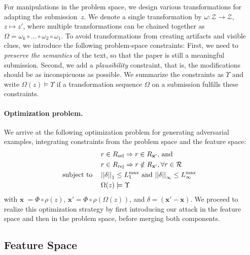\documentclass[letterpaper,twocolumn,10pt]{article}
\newcommand{\bow}{\textbf{x}}
\newcommand{\submission}{\bow}
\newcommand{\reviewersset}{\mathcal{R}}
\newcommand{\reviewersubset}{R}
\newcommand{\reviewer}{r}
\newcommand{\select}{\text{sel}}
\newcommand{\reject}{\text{rej}}
\newcommand{\requestedreviewers}{\reviewersubset_{\select}}
\newcommand{\rejectedreviewers}{\reviewersubset_{\reject}}
\newcommand{\extractor}{\Phi}
\newcommand{\modifications}{\delta}
\newcommand{\modificationsmannorm}{{\left| \left| \modifications \right| \right|}_1}
\newcommand{\modificationsinfnorm}{{\left| \left| \modifications \right| \right|}_\infty}
\newcommand{\maxmannorm}{L_1^\text{max}}
\newcommand{\maxinfnorm}{L_\infty^\text{max}}
\newcommand{\Dom}{\ensuremath{\mathcal{Z}}\xspace}
\newcommand{\preprocessing}{\ensuremath{\rho}\xspace}
\newcommand{\inputpdf}{\ensuremath{z}\xspace}
\newcommand{\transformation}{\ensuremath{\omega}\xspace}
\newcommand{\transformations}{\ensuremath{\Omega}\xspace} \begin{acronym}
\begin{document}
For manipulations in the problem space, we design various transformations for adapting the submission~\inputpdf. We denote a single transformation by $\transformation : \Dom \longrightarrow \Dom$,$\;$ $\inputpdf \mapsto \inputpdf'$, where multiple transformations can be chained together as $\transformations = \transformation_k \circ \dots \circ \transformation_2 \circ \transformation_1$. To avoid transformations from creating artifacts and visible clues, we introduce the following problem-space constraints:
First, we need to \emph{preserve the semantics} of the text, so that the paper is still a meaningful submission. Second, we add a \emph{plausibility} constraint, that is, the modifications should be as inconspicuous as possible. 
We summarize the constraints as $\Upsilon$ and write \mbox{$\transformations(\inputpdf) \models \Upsilon$} if a transformation sequence \transformations on a submission fulfills these constraints.

\paragraph{Optimization problem.}
We arrive at the following optimization problem for generating adversarial examples, integrating constraints from the problem space and the feature space:
\begin{equation}
\label{eq:attack-goal}
\begin{split}
  & r \in \requestedreviewers \Rightarrow r \in \reviewersubset_{\submission'} \text{, and} \\ 
  &  r \in \rejectedreviewers \Rightarrow r \notin \reviewersubset_{\submission'}, \forall \reviewer \in \reviewersset\\
\text{ subject to \;\; } & 
\modificationsmannorm \leq \maxmannorm \text{ and }
 \modificationsinfnorm \leq \maxinfnorm \\
& \transformations(\inputpdf) \models \Upsilon 
\end{split}
\end{equation}
with \mbox{$\submission \; = \extractor \circ \preprocessing (\inputpdf)$}, \mbox{$\submission' = \extractor \circ \preprocessing (\transformations(\inputpdf))$}, and \mbox{$\modifications = (\submission' - \submission)$}.
We proceed to realize this optimization strategy by first introducing our attack in the feature space and then in the problem space, before merging both components.

\subsection{Feature Space}
\label{sec:feature-space}
\end{document}
